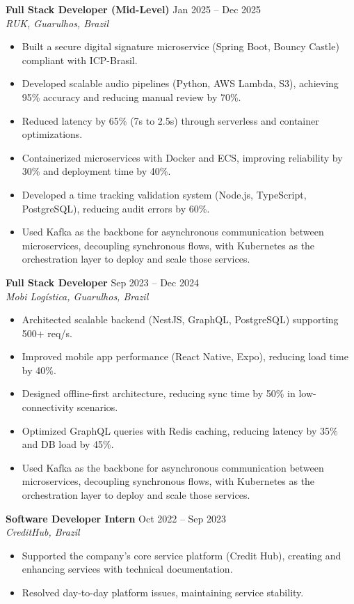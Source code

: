 \documentclass[10pt,letterpaper]{article}
\begin{document}
\textbf{Full Stack Developer (Mid-Level)} \hfill Jan 2025 -- Dec 2025 \\
\textit{RUK, Guarulhos, Brazil}
\begin{itemize}[leftmargin=*, itemsep=2pt]
    \item Built a secure digital signature microservice (Spring Boot, Bouncy Castle) compliant with ICP-Brasil.
    \item Developed scalable audio pipelines (Python, AWS Lambda, S3), achieving 95\% accuracy and reducing manual review by 70\%.
    \item Reduced latency by 65\% (7s to 2.5s) through serverless and container optimizations.
    \item Containerized microservices with Docker and ECS, improving reliability by 30\% and deployment time by 40\%.
    \item Developed a time tracking validation system (Node.js, TypeScript, PostgreSQL), reducing audit errors by 60\%.
    \item Used Kafka as the backbone for asynchronous communication between microservices, decoupling synchronous flows, with Kubernetes as the orchestration layer to deploy and scale those services.
\end{itemize}

\textbf{Full Stack Developer} \hfill Sep 2023 -- Dec 2024 \\
\textit{Mobi Logística, Guarulhos, Brazil}
\begin{itemize}[leftmargin=*, itemsep=2pt]
    \item Architected scalable backend (NestJS, GraphQL, PostgreSQL) supporting 500+ req/s.
    \item Improved mobile app performance (React Native, Expo), reducing load time by 40\%.
    \item Designed offline-first architecture, reducing sync time by 50\% in low-connectivity scenarios.
    \item Optimized GraphQL queries with Redis caching, reducing latency by 35\% and DB load by 45\%.
    \item Used Kafka as the backbone for asynchronous communication between microservices, decoupling synchronous flows, with Kubernetes as the orchestration layer to deploy and scale those services.
\end{itemize}

\textbf{Software Developer Intern} \hfill Oct 2022 -- Sep 2023 \\
\textit{CreditHub, Brazil}
\begin{itemize}[leftmargin=*, itemsep=2pt]
    \item Supported the company's core service platform (Credit Hub), creating and enhancing services with technical documentation.
    \item Resolved day-to-day platform issues, maintaining service stability.
\end{itemize}
\end{document}
